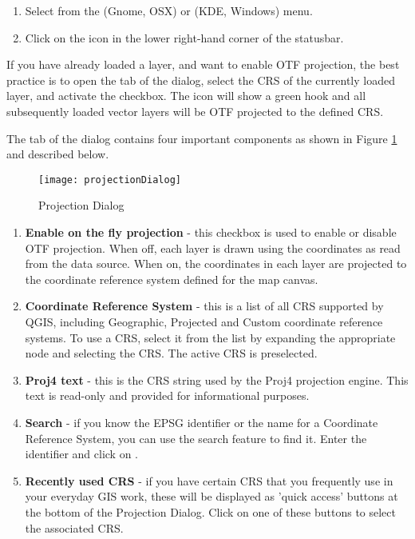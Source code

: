\begin{enumerate}
\item Select  from the
 (Gnome, OSX) or  (KDE, Windows) menu.
\item Click on the  icon in the
lower right-hand corner of the statusbar.
\end{enumerate}

If you have already loaded a layer, and want to enable OTF projection, the
best practice is to open the  tab of the
 dialog, select the CRS of the currently loaded
layer, and activate the  checkbox. The
 icon will show a green hook
and all subsequently loaded vector layers will be OTF projected to the
defined CRS.
 
The  tab of the 
dialog contains four important components as shown in Figure
\ref{fig:projections} and described below.

\begin{figure}[ht]
   \begin{center}
   \caption{Projection Dialog \nixcaption}\label{fig:projections}\smallskip
   \texttt{[image: projectionDialog]}
\end{center}  
\end{figure}

\begin{enumerate}
\item \textbf{Enable on the fly projection} -
this checkbox is used to enable or disable OTF projection. When off, each
layer is drawn using the coordinates as read from the data source. When on,
the coordinates in each layer are projected to the coordinate reference
system defined for the map canvas.
\item \textbf{Coordinate Reference System} - this is a list of all CRS
supported by QGIS, including Geographic, Projected and Custom coordinate
reference systems. To use a CRS, select it from the list by expanding
the appropriate node and selecting the CRS. The active CRS is preselected.
\item \textbf{Proj4 text} - this is the CRS string used by the Proj4
projection engine. This text is read-only and provided for informational
purposes.
\item \textbf{Search} - if you know the EPSG identifier or the name 
for a Coordinate Reference System, you can use the search feature to find it.
Enter the identifier and click on .
\item \textbf{Recently used CRS} - if you have certain CRS that you frequently 
use in your everyday GIS work, these will be displayed as 'quick access' buttons 
at the bottom of the Projection Dialog. Click on one of these buttons to select 
the associated CRS.
\end{enumerate}

